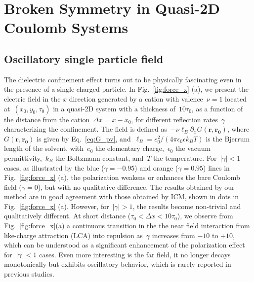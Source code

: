 \section{Broken Symmetry in Quasi-2D Coulomb Systems}

\subsection{Oscillatory single particle field}

The dielectric confinement effect turns out to be physically fascinating even in the presence of a single charged particle. 
In Fig.~\ref{fig:force_x} (a), we present the electric field in the $x$ direction generated by a cation with valence~$\nu=1$ located at~$(x_0, y_0, \tau_0)$ in a quasi-2D system with a thickness of~$10\tau_0$, as a function of the distance from the cation~$\Delta x=x-x_0$, for different reflection rates~$\gamma$ characterizing the confinement. 
The field is defined as~$-\nu\ell_B\partial_x G(\mathbf{r}, \mathbf{r_0})$, where~$G(\mathbf{r}, \mathbf{r_0})$ is given by Eq.~\eqref{eq:G_pv}, and~$\ell_B=e_0^2/(4\pi\epsilon_0\epsilon k_B T)$ is the Bjerrum length of the solvent, with~$e_0$ the elementary charge,~$\epsilon_0$ the vacuum permittivity,~$k_B$ the Boltzmann constant, and~$T$ the temperature. 
For~$\vert\gamma\vert<1$ cases, as illustrated by the blue ($\gamma=-0.95$) and orange ($\gamma=0.95$) lines in Fig.~\ref{fig:force_x} (a), the polarization weakens or enhances the bare Coulomb field ($\gamma=0$), but with no qualitative difference. 
The results obtained by our method are in good agreement with those obtained by ICM, shown in dots in Fig.~\ref{fig:force_x} (a). 
However, for~$\vert\gamma\vert>1$, the results become non-trivial and qualitatively different. 
At short distance ($\tau_0<\Delta x < 10\tau_0$), we observe from Fig.~\ref{fig:force_x}(a) a continuous transition in the the near field interaction from like-charge attraction (LCA) into repulsion as~$\gamma$ increases from $-10$ to $+10$,
which can be understood as a significant enhancement of the polarization effect for~$\lvert\gamma\rvert<1$ cases.
Even more interesting is the far field, it no longer decays monotonically but exhibits oscillatory behavior, which is rarely reported in previous studies.

